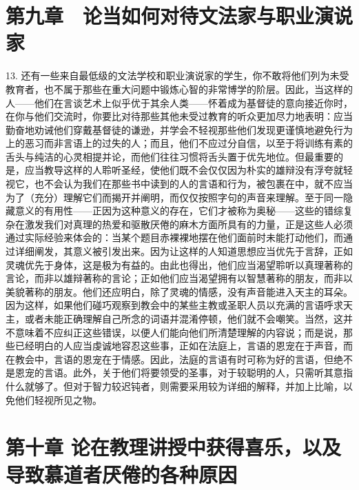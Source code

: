 
\section{第九章　论当如何对待文法家与职业演说家}

13. 还有一些来自最低级的文法学校和职业演说家的学生，你不敢将他们列为未受教育者，也不属于那些在重大问题中锻炼心智的非常博学的阶层。因此，当这样的人——他们在言谈艺术上似乎优于其余人类——怀着成为基督徒的意向接近你时，在你与他们交流时，你要比对待那些其他未受过教育的听众更加尽力地表明：应当勤奋地劝诫他们穿戴基督徒的谦逊，并学会不轻视那些他们发现更谨慎地避免行为上的恶习而非言语上的过失的人；而且，他们不应过分自信，以至于将训练有素的舌头与纯洁的心灵相提并论，而他们往往习惯将舌头置于优先地位。但最重要的是，应当教导这样的人聆听圣经，使他们既不会仅仅因为朴实的雄辩没有浮夸就轻视它，也不会认为我们在那些书中读到的人的言语和行为，被包裹在中，就不应当为了（充分）理解它们而揭开并阐明，而仅仅按照字句的声音来理解。至于同一隐藏意义的有用性——正因为这种意义的存在，它们才被称为奥秘——这些的错综复杂在激发我们对真理的热爱和驱散厌倦的麻木方面所具有的力量，正是这些人必须通过实际经验来体会的：当某个题目赤裸裸地摆在他们面前时未能打动他们，而通过详细阐发，其意义被引发出来。因为让这样的人知道思想应当优先于言辞，正如灵魂优先于身体，这是极为有益的。由此也得出，他们应当渴望聆听以真理著称的言论，而非以雄辩著称的言论；正如他们应当渴望拥有以智慧著称的朋友，而非以美貌著称的朋友。他们还应明白，除了灵魂的情感，没有声音能进入天主的耳朵。因为这样，如果他们碰巧观察到教会中的某些主教或圣职人员以充满的言语呼求天主，或者未能正确理解自己所念的词语并混淆停顿，他们就不会嘲笑。当然，这并不意味着不应纠正这些错误，以便人们能向他们所清楚理解的内容说；而是说，那些已经明白的人应当虔诚地容忍这些事，正如在法庭上，言语的恩宠在于声音，而在教会中，言语的恩宠在于情感。因此，法庭的言语有时可称为好的言语，但绝不是恩宠的言语。此外，关于他们将要领受的圣事，对于较聪明的人，只需听其意指什么就够了。但对于智力较迟钝者，则需要采用较为详细的解释，并加上比喻，以免他们轻视所见之物。\par


\section{第十章 论在教理讲授中获得喜乐，以及导致慕道者厌倦的各种原因}

